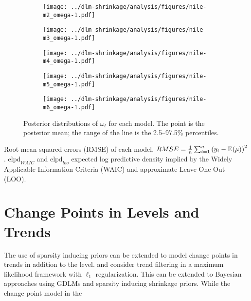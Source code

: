 \begin{figure}[htpb!]
  \centering
  \begin{subfigure}[b]{0.5\linewidth}
    \texttt{[image: ../dlm-shrinkage/analysis/figures/nile-m2\_omega-1.pdf]}    
    \caption{}
  \end{subfigure}%
  \begin{subfigure}[b]{0.5\linewidth}
    \texttt{[image: ../dlm-shrinkage/analysis/figures/nile-m3\_omega-1.pdf]}
    \caption{}
  \end{subfigure}
  \begin{subfigure}[b]{0.5\linewidth}
    \texttt{[image: ../dlm-shrinkage/analysis/figures/nile-m4\_omega-1.pdf]}    
    \caption{}
  \end{subfigure}%
  \begin{subfigure}[b]{0.5\linewidth}
    \texttt{[image: ../dlm-shrinkage/analysis/figures/nile-m5\_omega-1.pdf]}
    \caption{}
  \end{subfigure}
  \begin{subfigure}[b]{0.5\linewidth}
    \texttt{[image: ../dlm-shrinkage/analysis/figures/nile-m6\_omega-1.pdf]}    
    \caption{}
  \end{subfigure}
  \caption{Posterior distributions of $\omega_t$ for each model. The point is the posterior mean; the range of the line is the 2.5--97.5\% percentiles.}
  \label{dlm:fig:nile_omega_posterior}
\end{figure}



\begin{table}[thbp]
  \centering
  
  \caption{
    Root mean squared errors (RMSE) of each model, $RMSE = \frac{1}{n} \sum_{i = 1}^{n} {\left( y_{i} - \operatorname{E}(\mu) \right)}^{2}$.
    $\mathrm{elpd}_{WAIC}$ and $\mathrm{elpd}_{loo}$ expected log predictive density implied by the Widely Applicable Information Criteria (WAIC) and approximate Leave One Out (LOO).
  }
\end{table}


\section{Change Points in Levels and Trends}
\label{dlm:sec:linear-filtering}


The use of sparsity inducing priors can be extended to model change points in trends in addition to the level.
\textcite{KimKohBoydEtAl2009} and \textcite{Tibshirani2014} consider trend filtering in a maximum likelihood framework with $\ell_{1}$ regularization.
This can be extended to Bayesian approaches using GDLMs and sparsity inducing shrinkage priors.
While the change point model in the 

